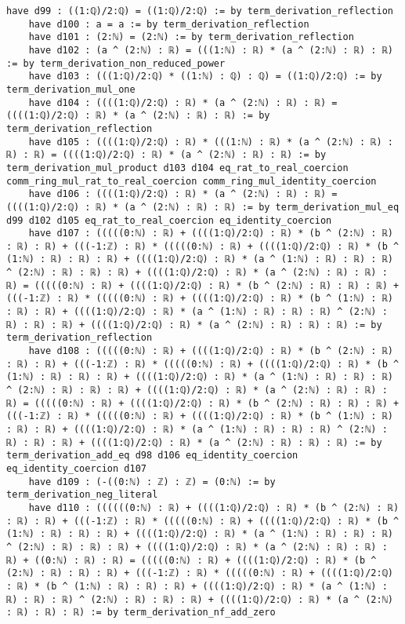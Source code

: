 \documentclass{article}
\begin{document}
\begin{tcolorbox}[colback=white!10, width=\linewidth]
\begin{lstlisting}[language=Lean4]
    have d99 : ((1:ℚ)/2:ℚ) = ((1:ℚ)/2:ℚ) := by term_derivation_reflection
    have d100 : a = a := by term_derivation_reflection
    have d101 : (2:ℕ) = (2:ℕ) := by term_derivation_reflection
    have d102 : (a ^ (2:ℕ) : ℝ) = (((1:ℕ) : ℝ) * (a ^ (2:ℕ) : ℝ) : ℝ) := by term_derivation_non_reduced_power
    have d103 : (((1:ℚ)/2:ℚ) * ((1:ℕ) : ℚ) : ℚ) = ((1:ℚ)/2:ℚ) := by term_derivation_mul_one
    have d104 : ((((1:ℚ)/2:ℚ) : ℝ) * (a ^ (2:ℕ) : ℝ) : ℝ) = ((((1:ℚ)/2:ℚ) : ℝ) * (a ^ (2:ℕ) : ℝ) : ℝ) := by term_derivation_reflection
    have d105 : ((((1:ℚ)/2:ℚ) : ℝ) * (((1:ℕ) : ℝ) * (a ^ (2:ℕ) : ℝ) : ℝ) : ℝ) = ((((1:ℚ)/2:ℚ) : ℝ) * (a ^ (2:ℕ) : ℝ) : ℝ) := by term_derivation_mul_product d103 d104 eq_rat_to_real_coercion comm_ring_mul_rat_to_real_coercion comm_ring_mul_identity_coercion
    have d106 : ((((1:ℚ)/2:ℚ) : ℝ) * (a ^ (2:ℕ) : ℝ) : ℝ) = ((((1:ℚ)/2:ℚ) : ℝ) * (a ^ (2:ℕ) : ℝ) : ℝ) := by term_derivation_mul_eq d99 d102 d105 eq_rat_to_real_coercion eq_identity_coercion
    have d107 : (((((0:ℕ) : ℝ) + ((((1:ℚ)/2:ℚ) : ℝ) * (b ^ (2:ℕ) : ℝ) : ℝ) : ℝ) + (((-1:ℤ) : ℝ) * (((((0:ℕ) : ℝ) + ((((1:ℚ)/2:ℚ) : ℝ) * (b ^ (1:ℕ) : ℝ) : ℝ) : ℝ) + ((((1:ℚ)/2:ℚ) : ℝ) * (a ^ (1:ℕ) : ℝ) : ℝ) : ℝ) ^ (2:ℕ) : ℝ) : ℝ) : ℝ) + ((((1:ℚ)/2:ℚ) : ℝ) * (a ^ (2:ℕ) : ℝ) : ℝ) : ℝ) = (((((0:ℕ) : ℝ) + ((((1:ℚ)/2:ℚ) : ℝ) * (b ^ (2:ℕ) : ℝ) : ℝ) : ℝ) + (((-1:ℤ) : ℝ) * (((((0:ℕ) : ℝ) + ((((1:ℚ)/2:ℚ) : ℝ) * (b ^ (1:ℕ) : ℝ) : ℝ) : ℝ) + ((((1:ℚ)/2:ℚ) : ℝ) * (a ^ (1:ℕ) : ℝ) : ℝ) : ℝ) ^ (2:ℕ) : ℝ) : ℝ) : ℝ) + ((((1:ℚ)/2:ℚ) : ℝ) * (a ^ (2:ℕ) : ℝ) : ℝ) : ℝ) := by term_derivation_reflection
    have d108 : (((((0:ℕ) : ℝ) + ((((1:ℚ)/2:ℚ) : ℝ) * (b ^ (2:ℕ) : ℝ) : ℝ) : ℝ) + (((-1:ℤ) : ℝ) * (((((0:ℕ) : ℝ) + ((((1:ℚ)/2:ℚ) : ℝ) * (b ^ (1:ℕ) : ℝ) : ℝ) : ℝ) + ((((1:ℚ)/2:ℚ) : ℝ) * (a ^ (1:ℕ) : ℝ) : ℝ) : ℝ) ^ (2:ℕ) : ℝ) : ℝ) : ℝ) + ((((1:ℚ)/2:ℚ) : ℝ) * (a ^ (2:ℕ) : ℝ) : ℝ) : ℝ) = (((((0:ℕ) : ℝ) + ((((1:ℚ)/2:ℚ) : ℝ) * (b ^ (2:ℕ) : ℝ) : ℝ) : ℝ) + (((-1:ℤ) : ℝ) * (((((0:ℕ) : ℝ) + ((((1:ℚ)/2:ℚ) : ℝ) * (b ^ (1:ℕ) : ℝ) : ℝ) : ℝ) + ((((1:ℚ)/2:ℚ) : ℝ) * (a ^ (1:ℕ) : ℝ) : ℝ) : ℝ) ^ (2:ℕ) : ℝ) : ℝ) : ℝ) + ((((1:ℚ)/2:ℚ) : ℝ) * (a ^ (2:ℕ) : ℝ) : ℝ) : ℝ) := by term_derivation_add_eq d98 d106 eq_identity_coercion eq_identity_coercion d107
    have d109 : (-((0:ℕ) : ℤ) : ℤ) = (0:ℕ) := by term_derivation_neg_literal
    have d110 : ((((((0:ℕ) : ℝ) + ((((1:ℚ)/2:ℚ) : ℝ) * (b ^ (2:ℕ) : ℝ) : ℝ) : ℝ) + (((-1:ℤ) : ℝ) * (((((0:ℕ) : ℝ) + ((((1:ℚ)/2:ℚ) : ℝ) * (b ^ (1:ℕ) : ℝ) : ℝ) : ℝ) + ((((1:ℚ)/2:ℚ) : ℝ) * (a ^ (1:ℕ) : ℝ) : ℝ) : ℝ) ^ (2:ℕ) : ℝ) : ℝ) : ℝ) + ((((1:ℚ)/2:ℚ) : ℝ) * (a ^ (2:ℕ) : ℝ) : ℝ) : ℝ) + ((0:ℕ) : ℝ) : ℝ) = (((((0:ℕ) : ℝ) + ((((1:ℚ)/2:ℚ) : ℝ) * (b ^ (2:ℕ) : ℝ) : ℝ) : ℝ) + (((-1:ℤ) : ℝ) * (((((0:ℕ) : ℝ) + ((((1:ℚ)/2:ℚ) : ℝ) * (b ^ (1:ℕ) : ℝ) : ℝ) : ℝ) + ((((1:ℚ)/2:ℚ) : ℝ) * (a ^ (1:ℕ) : ℝ) : ℝ) : ℝ) ^ (2:ℕ) : ℝ) : ℝ) : ℝ) + ((((1:ℚ)/2:ℚ) : ℝ) * (a ^ (2:ℕ) : ℝ) : ℝ) : ℝ) := by term_derivation_nf_add_zero

\end{lstlisting}
\end{tcolorbox}
\end{document}
